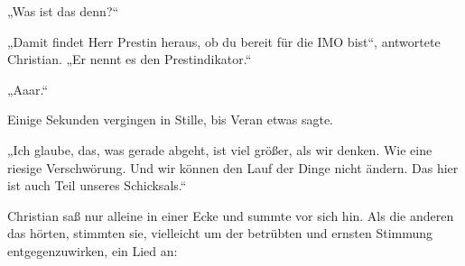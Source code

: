\documentclass[oneside]{memoir}
\begin{document}
„Was ist das denn?“

„Damit findet Herr Prestin heraus, ob du bereit für die IMO bist“, antwortete Christian. „Er nennt es den Prestindikator.“

„Aaar.“

Einige Sekunden vergingen in Stille, bis Veran etwas sagte.

„Ich glaube, das, was gerade abgeht, ist viel größer, als wir denken. Wie eine riesige Verschwörung. Und wir können den Lauf der Dinge nicht ändern. Das hier ist auch Teil unseres Schicksals.“

Christian saß nur alleine in einer Ecke und summte vor sich hin. Als die anderen das hörten, stimmten sie, vielleicht um der betrübten und ernsten Stimmung entgegenzuwirken, ein Lied an: \\
\end{document}

